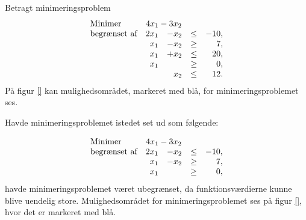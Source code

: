\begin{eks}
Betragt minimeringsproblem
%
\begin{align*}
\begin{array}{lrrlr}
\text{Minimer}		&	\multicolumn{2}{c}{4x_1-3x_2}  &\\
\text{begrænset af}	&2x_1& - x_2			&\leq 	&-10,\\
					&x_1& - x_2				&\geq	& 7,\\
					&x_1& + x_2				&\leq	& 20,\\
					&x_1&					&\geq	& 0,\\
					& &x_2					&\leq	& 12.
\end{array}
\end{align*}
%
På figur \ref{} kan mulighedsområdet, markeret med blå, for minimeringsproblemet ses.
%

% 
Havde minimeringsproblemet istedet set ud som følgende: 

\begin{align*}
\begin{array}{lrrlr}
\text{Minimer}		&	\multicolumn{2}{c}{4x_1-3x_2}  &\\
\text{begrænset af}	&2x_1& - x_2			&\leq 	&-10,\\
					&x_1& - x_2				&\geq	& 7,\\
					&x_1&					&\geq	& 0,
\end{array}
\end{align*}
havde minimeringsproblemet været ubegrænset, da funktionsværdierne kunne blive uendelig store. 
Mulighedsområdet for minimeringsproblemet ses på figur \ref{}, hvor det er markeret med blå.
%

%
\end{eks}